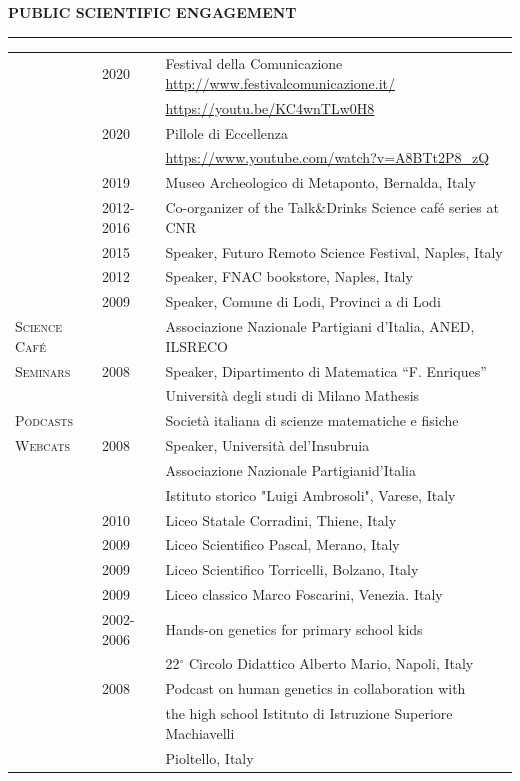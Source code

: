\documentclass[openany]{book}
\begin{document}
\vspace{0.4cm}
\noindent
\MakeUppercase{\textbf{Public Scientific Engagement}}
\vspace{0.2cm}
\sectionlineskip
\hrule
\vspace{0.2cm}
\noindent

\begin{tabular}{l{1.5cm} l l{4cm}}
 & 2020 & Festival della Comunicazione \url{http://www.festivalcomunicazione.it/}\\
 & & \url{https://youtu.be/KC4wnTLw0H8}\\
& 2020 & Pillole di Eccellenza \\
& & \url{https://www.youtube.com/watch?v=A8BTt2P8_zQ}\\
 & 2019 & Museo Archeologico di Metaponto, Bernalda, Italy\\
 & 2012-2016 &  Co-organizer of the Talk\&Drinks Science caf\'e series at CNR \\
  & 2015 &  Speaker, Futuro Remoto Science Festival, Naples, Italy\\
  & 2012 & Speaker, FNAC bookstore, Naples, Italy \\
  & 2009 & Speaker, Comune di Lodi, Provinci a di Lodi\\ 
\textsc{Science Caf\'e} & & Associazione Nazionale Partigiani d'Italia, ANED, ILSRECO\\
\textsc{Seminars} & 2008 &  Speaker, Dipartimento di Matematica ``F. Enriques''\\ & & Universit\`a degli studi di Milano Mathesis\\ 
\textsc{Podcasts} & & Societ\`a italiana di scienze matematiche e fisiche\\
\textsc{Webcats} & 2008 & Speaker, Universit\`a del'Insubruia\\
 & & Associazione Nazionale Partigianid'Italia\\
 & & Istituto storico "Luigi Ambrosoli", Varese, Italy\\
 & 2010 & Liceo Statale Corradini, Thiene, Italy\\
 & 2009 & Liceo Scientifico Pascal, Merano, Italy\\
 & 2009 &Liceo Scientifico Torricelli, Bolzano, Italy \\
 & 2009 & Liceo classico Marco Foscarini, Venezia. Italy\\ 
 & 2002-2006 & Hands-on genetics for primary school kids\\
 & & 22$^\circ$ Circolo Didattico Alberto Mario, Napoli, Italy\\
  & 2008 &  Podcast on human genetics in collaboration with \\
 & & the high school Istituto di Istruzione Superiore Machiavelli\\ 
 & & Pioltello, Italy\\
\end{tabular}
\end{document}
